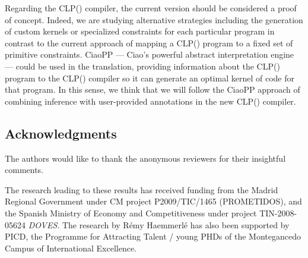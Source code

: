 \documentclass{llncs}
\newcommand{\clpfd}{CLP()\xspace}
\newcommand{\fd}{\xspace}
\begin{document}
Regarding the \clpfd compiler, the current version should be
considered a proof of concept. Indeed, we are studying alternative
strategies including the generation of custom kernels or specialized
\fd constraints for each particular program in contrast to the current
approach of mapping a \clpfd program to a fixed set of primitive
constraints. CiaoPP --- Ciao's powerful abstract interpretation engine
--- could be used in the translation, providing information about the
\clpfd program to the \clpfd compiler so it can generate an optimal
kernel of \fd code for that program.  In this sense, we think that we
will follow the CiaoPP approach of combining inference with
user-provided annotations in the new \clpfd compiler.

\subsection*{Acknowledgments}

The authors would like to thank the anonymous reviewers for their
insightful comments.

The research leading to these results has received funding from the
Madrid Regional Government under CM project P2009/TIC/1465
(PROMETIDOS), and the Spanish Ministry of Economy and Competitiveness
under project TIN-2008-05624 {\em DOVES}.  The research by R\'emy
Haemmerl\'e has also been supported by PICD, the Programme for
Attracting Talent / young PHDs of the Montegancedo Campus of
International Excellence.
\end{document}
